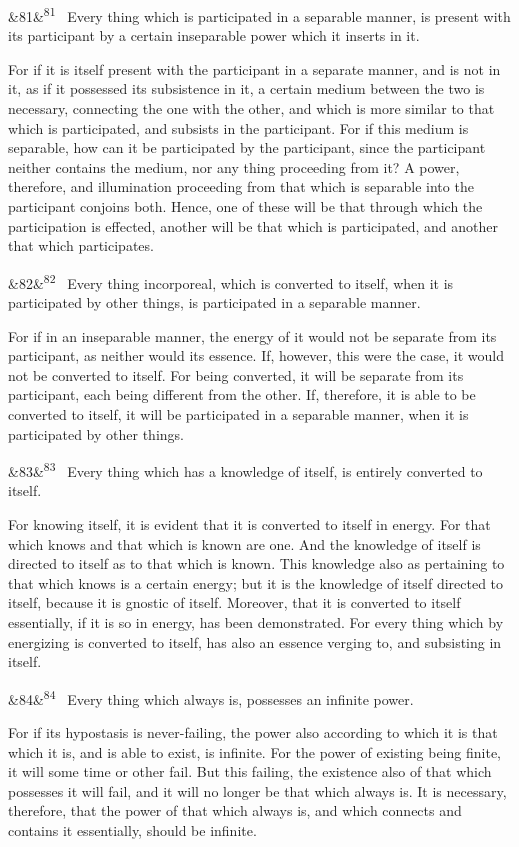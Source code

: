 \documentclass[12pt]{article}
\newcommand{\para}[1][]{\par\noindent\ifx&#1&\else\textsuperscript{\footnotesize #1}~\fi}
\begin{document}
\para[81] Every thing which is participated in a separable manner, is present with its participant by a certain inseparable power which it inserts in it.

For if it is itself present with the participant in a separate manner, and is not in it, as if it possessed its subsistence in it, a certain medium between the two is necessary, connecting the one with the other, and which is more similar to that which is participated, and subsists in the participant. For if this medium is separable, how can it be participated by the participant, since the participant neither contains the medium, nor any thing proceeding from it? A power, therefore, and illumination proceeding from that which is separable into the participant conjoins both. Hence, one of these will be that through which the participation is effected, another will be that which is participated, and another that which participates.

\para[82] Every thing incorporeal, which is converted to itself, when it is participated by other things, is participated in a separable manner.

For if in an inseparable manner, the energy of it would not be separate from its participant, as neither would its essence. If, however, this were the case, it would not be converted to itself. For being converted, it will be separate from its participant, each being different from the other. If, therefore, it is able to be converted to itself, it will be participated in a separable manner, when it is participated by other things.

\para[83] Every thing which has a knowledge of itself, is entirely converted to itself.

For knowing itself, it is evident that it is converted to itself in energy. For that which knows and that which is known are one. And the knowledge of itself is directed to itself as to that which is known. This knowledge also as pertaining to that which knows is a certain energy; but it is the knowledge of itself directed to itself, because it is gnostic of itself. Moreover, that it is converted to itself essentially, if it is so in energy, has been demonstrated. For every thing which by energizing is converted to itself, has also an essence verging to, and subsisting in itself.

\para[84] Every thing which always is, possesses an infinite power.

For if its hypostasis is never-failing, the power also according to which it is that which it is, and is able to exist, is infinite. For the power of existing being finite, it will some time or other fail. But this failing, the existence also of that which possesses it will fail, and it will no longer be that which always is. It is necessary, therefore, that the power of that which always is, and which connects and contains it essentially, should be infinite.
\end{document}
